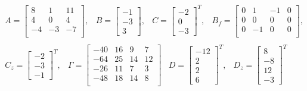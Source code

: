 \begin{equation}
    \begin{array}{cc}
        \begin{array}{cccc}
            A = \begin{bmatrix}
                8 & 1 & 11 \\ 
                4 & 0 & 4 \\ 
                -4 & -3 & -7 \\ 
            \end{bmatrix}, & 
            B = \begin{bmatrix} -1 \\ -3 \\ 3 \end{bmatrix}, &
            C = \begin{bmatrix} -2 \\ 0 \\ -3 \end{bmatrix}^T, & 
            B_f = \begin{bmatrix}
                0 & 1 & -1 & 0 \\ 
                0 & 0 & 0 & 0 \\
                0 & -1 & 0 & 0 \\
            \end{bmatrix}, 
        \end{array} \\ 
        \begin{array}{cccc}
        C_z = \begin{bmatrix} -2 \\ -3 \\ -1 \end{bmatrix}^T, & 
        \Gamma = \begin{bmatrix}
            -40 & 16 & 9 & 7 \\ 
            -64 & 25 & 14 & 12 \\
            -26 & 11 & 7 & 3 \\ 
            -48 & 18 & 14 & 8 \\ 
        \end{bmatrix} & 
        D = \begin{bmatrix}-12 \\ 2 \\ 2 \\ 6\end{bmatrix}^T, & 
        D_z = \begin{bmatrix}8 \\ -8 \\ 12 \\ -3\end{bmatrix}^T
        \end{array}
    \end{array}
\end{equation}

